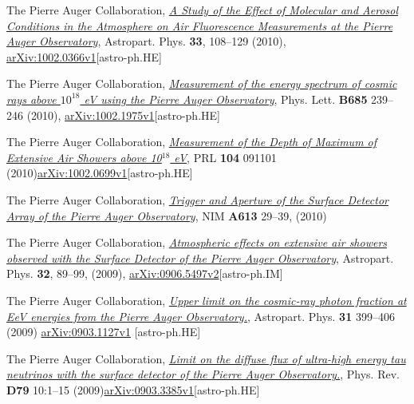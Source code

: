 \begin{etaremune}
\item {}The Pierre Auger Collaboration,
\href{http://dx.doi.org/10.1016/j.astropartphys.2009.12.005}{\emph{A Study of
the Effect of Molecular and Aerosol Conditions in the Atmosphere on Air
Fluorescence Measurements at the Pierre Auger Observatory}}, Astropart. Phys.
{\bf 33}, 108--129 (2010),
\href{http://arxiv.org/abs/0907.4282}{arXiv:1002.0366v1}[astro-ph.HE]

\item {}The Pierre Auger Collaboration,
\href{http://dx.doi.org/10.1016/j.physletb.2010.02.013}{\emph{Measurement of
the energy spectrum of cosmic rays above $10^{18}$ eV using the Pierre Auger
Observatory}}, Phys. Lett. {\bf B685} 239--246 (2010),
\href{http://arxiv.org/abs/1002.1975}{arXiv:1002.1975v1}[astro-ph.HE]

\item {}The Pierre Auger Collaboration,
\href{http://dx.doi.org/10.1103/PhysRevLett.104.091101}{\emph{Measurement of
the Depth of Maximum of Extensive Air Showers above 10$^{18}$ eV}}, PRL {\bf
104} 091101
(2010)\href{http://arxiv.org/abs/1002.0699}{arXiv:1002.0699v1}[astro-ph.HE]

\item {}The Pierre Auger Collaboration,
\href{http://dx.doi.org/10.1016/j.nima.2009.11.018}{\emph{Trigger and Aperture
of the Surface Detector Array of the Pierre Auger Observatory}}, NIM {\bf A613}
29--39, (2010)

\item {} The Pierre Auger Collaboration,
\href{http://dx.doi.org/10.1016/j.astropartphys.2009.06.004}{\emph{Atmospheric
effects on extensive air showers observed with the Surface Detector of the
Pierre Auger Observatory}}, Astropart. Phys. {\bf 32}, 89--99, (2009),
\href{http://arxiv.org/abs/0906.5497/}{arXiv:0906.5497v2}[astro-ph.IM]

\item {}The Pierre Auger Collaboration,
\href{http://dx.doi.org/10.1016/j.astropartphys.2009.04.003}{\emph{Upper limit
on the cosmic-ray photon fraction at EeV energies from the Pierre Auger
Observatory.}}, Astropart. Phys. {\bf 31} 399--406 (2009) 
\href{http://arxiv.org/abs/0903.1127/}{arXiv:0903.1127v1} [astro-ph.HE]

\item {}The Pierre Auger Collaboration,
\href{http://dx.doi.org/10.1103/PhysRevD.79.102001}{\emph{Limit on the diffuse
flux of ultra-high energy tau neutrinos with the surface detector of the Pierre
Auger Observatory.}}, Phys. Rev. {\bf D79} 10:1--15
(2009)\href{http://arxiv.org/abs/0903.3385/}{arXiv:0903.3385v1}[astro-ph.HE]


\end{etaremune}
